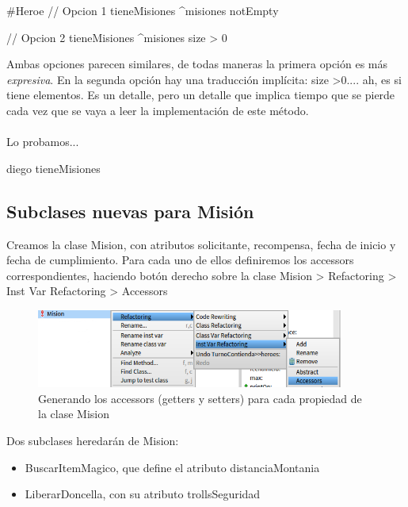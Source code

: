 \documentclass[a4paper,12pt]{book}
\begin{document}
\begin{code}
#Heroe
// Opcion 1
tieneMisiones
    ^misiones notEmpty
\end{code}

    
\begin{code}
// Opcion 2
tieneMisiones
    ^misiones size > 0
\end{code}

Ambas opciones parecen similares, de todas maneras la primera opción es más \textit{expresiva}. En la segunda
opción hay una traducción implícita: size \textgreater  0.... ah, es si tiene elementos. Es un detalle, 
pero un detalle que implica tiempo que se pierde cada vez que se vaya a leer la implementación de este método.
\\
\\
Lo probamos...

\begin{code}
diego tieneMisiones
\end{code}

\subsection{Subclases nuevas para Misión}
Creamos la clase Mision, con atributos solicitante, recompensa, fecha de inicio y fecha de cumplimiento. 
Para cada uno de ellos definiremos los accessors correspondientes, haciendo botón derecho sobre la clase
Mision > Refactoring > Inst Var Refactoring > Accessors 


\begin{figure}[h!]
    \centering
    \includegraphics[width=0.9\textwidth]{images/10_accessors.png}
    \caption{Generando los accessors (getters y setters) para cada propiedad de la clase Mision}
\end{figure}

\vspace{\baselineskip}
Dos subclases heredarán de Mision: 

\begin{itemize}
 \item BuscarItemMagico, que define el atributo distanciaMontania
 \item LiberarDoncella, con su atributo trollsSeguridad
\end{itemize}
\end{document}
